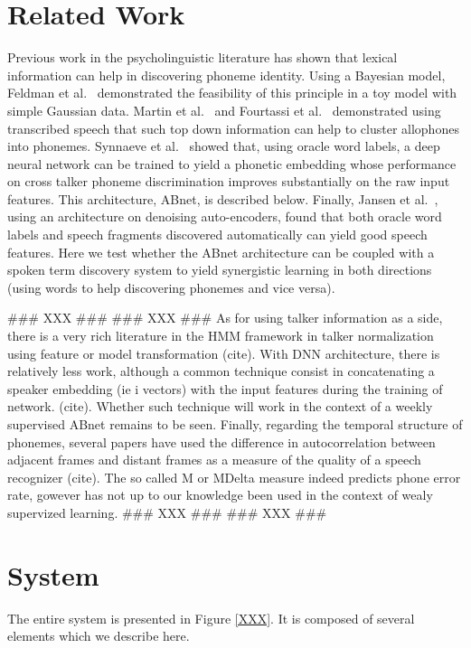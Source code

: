 \documentclass[a4paper]{article}
\begin{document}
\section{Related Work}

Previous work in the psycholinguistic literature has shown that lexical information can help in discovering phoneme identity. Using a Bayesian model, Feldman et al.~\cite{XXX} demonstrated the feasibility of this principle in a toy model with simple Gaussian data. Martin et al.~\cite{XXX} and Fourtassi et al.~\cite{XXX} demonstrated using transcribed speech that such top down information can help to cluster allophones into phonemes. Synnaeve et al.~\cite{XXX} showed that, using oracle word labels, a deep neural network can be trained to yield a phonetic embedding whose performance on cross talker phoneme discrimination improves substantially on the raw input features. This architecture, {\sc ABnet}, is described below. Finally, Jansen et al.~\cite{XXX}, using an architecture on denoising auto-encoders, found that both oracle word labels and speech fragments discovered automatically can yield good speech features. Here we test whether the ABnet architecture can be coupled with a spoken term discovery system to yield synergistic learning in both directions (using words to help discovering phonemes and vice versa). 

### XXX ###
### XXX ###
As for using talker information as a side, there is a very rich literature in the HMM framework in talker normalization using feature or model transformation (cite). With DNN architecture, there is relatively less work, although a common technique consist in concatenating a speaker embedding (ie i vectors) with the input features during the training of network. (cite). Whether such technique will work in the context of a weekly supervised ABnet remains to be seen. Finally, regarding the temporal structure of phonemes, several papers have used the difference in autocorrelation between adjacent frames and distant frames as a measure of the quality of a speech recognizer (cite). The so called M or MDelta measure indeed predicts phone error rate, gowever has not up to our knowledge been used in the context of wealy supervized learning.
### XXX ###
### XXX ###

\section{System}
The entire system is presented in Figure \ref{XXX}. It is composed of several elements which we describe here. 
\end{document}
